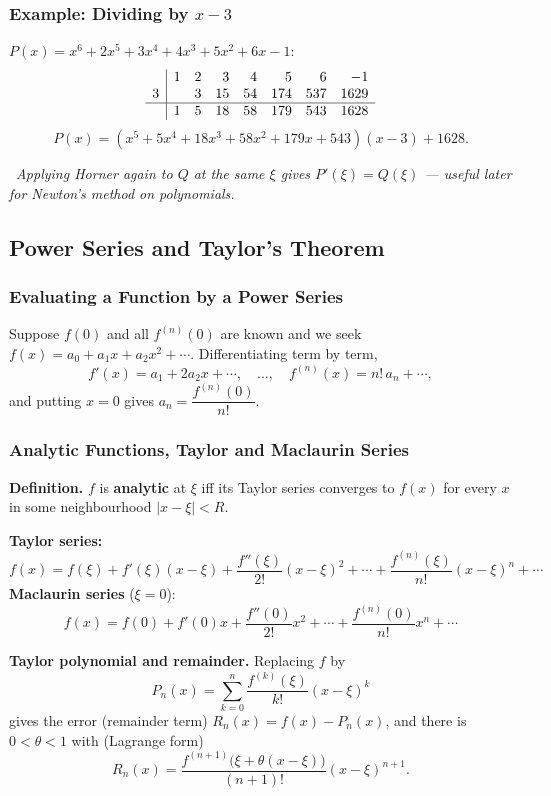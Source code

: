 \documentclass[hidelinks]{article}
\newcommand{\callout}[1]{\par\smallskip\noindent{\color{capri}$\blacktriangleright$}\ \textit{#1}\par\smallskip}
\newcommand{\abs}[1]{\left|#1\right|}
\begin{document}
\subsubsection{Example: Dividing by $x-3$}

$P(x)=x^6+2x^5+3x^4+4x^3+5x^2+6x-1$:
\[
\begin{array}{c|rrrrrrr}
 & 1 & 2 & 3 & 4 & 5 & 6 & -1\\
3 & & 3 & 15 & 54 & 174 & 537 & 1629\\ \hline
 & 1 & 5 & 18 & 58 & 179 & 543 & 1628\\
\end{array}
\]
\[
P(x)=(x^5+5x^4+18x^3+58x^2+179x+543)(x-3)+1628 .
\]

\callout{Applying Horner again to $Q$ at the same $\xi$ gives $P'(\xi)=Q(\xi)$ --- useful later for Newton's method on polynomials.}

\subsection{Power Series and Taylor's Theorem}

\subsubsection{Evaluating a Function by a Power Series}

Suppose $f(0)$ and all $f^{(n)}(0)$ are known and we seek $f(x)=a_0+a_1x+a_2x^2+\cdots$. Differentiating term by term,
\[
f'(x)=a_1+2a_2x+\cdots,\quad\dots,\quad f^{(n)}(x)=n!\,a_n+\cdots,
\]
and putting $x=0$ gives $a_n=\dfrac{f^{(n)}(0)}{n!}$.

\subsubsection{Analytic Functions, Taylor and Maclaurin Series}

\textbf{Definition.} $f$ is \textbf{analytic} at $\xi$ iff its Taylor series converges to $f(x)$ for every $x$ in some neighbourhood $\abs{x-\xi}<R$.

\textbf{Taylor series:}
\[
f(x)=f(\xi)+f'(\xi)(x-\xi)+\frac{f''(\xi)}{2!}(x-\xi)^2+\cdots+\frac{f^{(n)}(\xi)}{n!}(x-\xi)^n+\cdots
\]
\textbf{Maclaurin series} ($\xi=0$):
\[
f(x)=f(0)+f'(0)x+\frac{f''(0)}{2!}x^2+\cdots+\frac{f^{(n)}(0)}{n!}x^n+\cdots
\]

\textbf{Taylor polynomial and remainder.} Replacing $f$ by
\[
P_n(x)=\sum_{k=0}^n\frac{f^{(k)}(\xi)}{k!}(x-\xi)^k
\]
gives the error (remainder term) $R_n(x)=f(x)-P_n(x)$, and there is $0<\theta<1$ with (Lagrange form)
\[
R_n(x)=\frac{f^{(n+1)}\big(\xi+\theta(x-\xi)\big)}{(n+1)!}(x-\xi)^{n+1}.
\]
\end{document}
